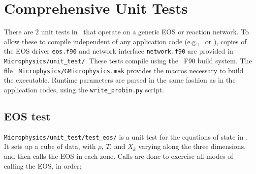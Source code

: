 \label{ch:unit_tests}

\section{Comprehensive Unit Tests}

There are 2 unit tests in \microphysics\ that operate on a generic EOS
or reaction network.  To allow these to compile independent of any
application code (e.g., \maestro\ or \castro), copies of the EOS
driver {\tt eos.f90} and network interface {\tt network.f90} are
provided in {\tt Microphysics/unit\_test/}.  These tests compile using
the \boxlib\ F90 build system.  The file {\tt
  Microphysics/GMicrophysics.mak} provides the macros necessary to
build the executable.  Runtime parameters are parsed in the same
fashion as in the application codes, using the {\tt write\_probin.py}
script.

\subsection{EOS test}

{\tt Microphysics/unit\_test/test\_eos/} is a unit test for the
equations of state in \microphysics.  It sets up a cube of data, with
$\rho$, $T$, and $X_k$ varying along the three dimensions, and then
calls the EOS in each zone.  Calls are done to exercise all modes of
calling the EOS, in order:

